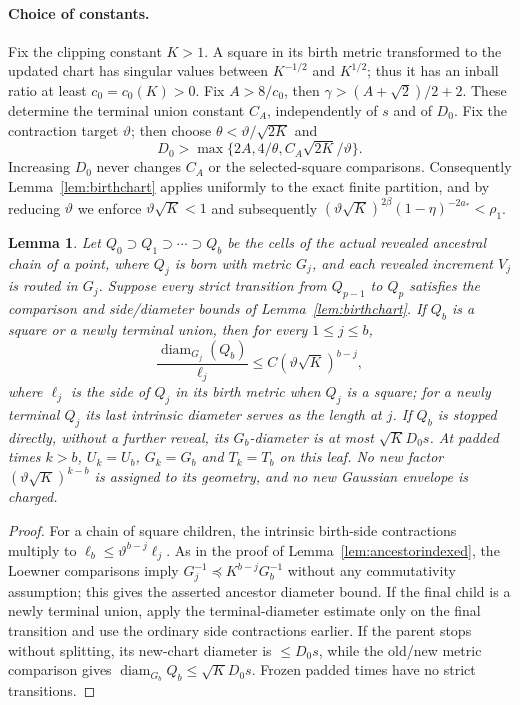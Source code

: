 \documentclass[11pt]{article}
\newtheorem{lemma}[lemma]{Lemma}
\theoremstyle{definition}
\theoremstyle{remark}
\numberwithin{equation}{section}
\newcommand{\diam}{\operatorname{diam}}
\begin{document}
\paragraph{Choice of constants.}
Fix the clipping constant $K>1$.  A square in its birth
metric transformed to the updated chart has singular values
between $K^{-1/2}$ and $K^{1/2}$; thus it has an inball
ratio at least $c_0=c_0(K)>0$.  Fix $A>8/c_0$,
then $\gamma>(A+\sqrt2)/2+2$.  These determine the terminal
union constant $C_A$, independently of $s$ and of
$D_0$.  Fix the contraction target $\vartheta$; then choose
$\theta<\vartheta/\sqrt{2K}$ and
\[
 D_0>\max\{2A,4/\theta,C_A\sqrt{2K}/\vartheta\}.
\]
Increasing $D_0$ never changes $C_A$ or the selected-square
comparisons.  Consequently Lemma~\ref{lem:birthchart}
applies uniformly to the exact finite partition, and by
reducing $\vartheta$ we enforce
$\vartheta\sqrt K<1$ and subsequently
$(\vartheta\sqrt K)^{2\beta}(1-\eta)^{-2a_*}<\rho_1$.

\begin{lemma}
\label{lem:actualreveal}
Let $Q_0\supset Q_1\supset\cdots\supset Q_b$
be the cells of the \emph{actual} revealed ancestral chain of
a point, where $Q_j$ is born with metric $G_j$, and each
revealed increment $V_j$ is routed in $G_j$.  Suppose every
strict transition from $Q_{p-1}$ to $Q_p$ satisfies the
comparison and side/diameter bounds of
Lemma~\ref{lem:birthchart}.  If $Q_b$ is a square or a
newly terminal union, then for every $1\le j\le b$,
\[
 \frac{\diam_{G_j}(Q_b)}{\ell_j}
  \le C(\vartheta\sqrt K)^{b-j},
\]
where $\ell_j$ is the side of $Q_j$ in its birth metric
when $Q_j$ is a square; for a newly terminal $Q_j$ its
last intrinsic diameter serves as the length at $j$.
If $Q_b$ is stopped directly, without a further reveal,
its $G_b$-diameter is at most $\sqrt K D_0s$.
At padded times $k>b$, $U_k=U_b$, $G_k=G_b$ and
$T_k=T_b$ on this leaf.  No new factor
$(\vartheta\sqrt K)^{k-b}$ is assigned to its geometry,
and no new Gaussian envelope is charged.
\end{lemma}
\begin{proof}
For a chain of square children, the intrinsic birth-side
contractions multiply to $\ell_b\le\vartheta^{b-j}\ell_j$.
As in the proof of Lemma~\ref{lem:ancestorindexed}, the Loewner
comparisons imply $G_j^{-1}\preceq K^{b-j}G_b^{-1}$ without any
commutativity assumption; this gives the asserted ancestor
diameter bound.
If the final child is a newly terminal union, apply the
terminal-diameter estimate only on the final transition and
use the ordinary side contractions earlier.  If the parent
stops without splitting, its new-chart diameter is
$\le D_0s$, while the old/new metric comparison gives
$\diam_{G_b}Q_b\le\sqrt K D_0s$.  Frozen padded times
have no strict transitions.
\end{proof}
\end{document}
